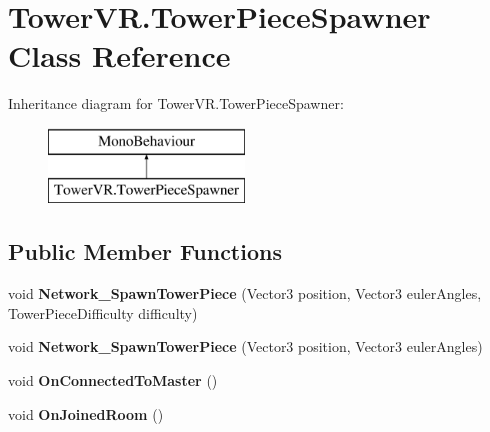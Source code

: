 \hypertarget{class_tower_v_r_1_1_tower_piece_spawner}{}\section{Tower\+V\+R.\+Tower\+Piece\+Spawner Class Reference}
\label{class_tower_v_r_1_1_tower_piece_spawner}
Inheritance diagram for Tower\+V\+R.\+Tower\+Piece\+Spawner\+:\begin{figure}[H]
\begin{center}
\leavevmode
\includegraphics[height=2.000000cm]{class_tower_v_r_1_1_tower_piece_spawner}
\end{center}
\end{figure}
\subsection*{Public Member Functions}
\begin{DoxyCompactItemize}
\item 
void {\bfseries Network\+\_\+\+Spawn\+Tower\+Piece} (Vector3 position, Vector3 euler\+Angles, Tower\+Piece\+Difficulty difficulty)\hypertarget{class_tower_v_r_1_1_tower_piece_spawner_a262d0e9b14f814ec49bc572d906d74f3}{}\label{class_tower_v_r_1_1_tower_piece_spawner_a262d0e9b14f814ec49bc572d906d74f3}

\item 
void {\bfseries Network\+\_\+\+Spawn\+Tower\+Piece} (Vector3 position, Vector3 euler\+Angles)\hypertarget{class_tower_v_r_1_1_tower_piece_spawner_aa167d6fdd1cd667dab34e935d9f82f57}{}\label{class_tower_v_r_1_1_tower_piece_spawner_aa167d6fdd1cd667dab34e935d9f82f57}

\item 
void {\bfseries On\+Connected\+To\+Master} ()\hypertarget{class_tower_v_r_1_1_tower_piece_spawner_a5318d7725ba9f0b6d0f215536c16a7a6}{}\label{class_tower_v_r_1_1_tower_piece_spawner_a5318d7725ba9f0b6d0f215536c16a7a6}

\item 
void {\bfseries On\+Joined\+Room} ()\hypertarget{class_tower_v_r_1_1_tower_piece_spawner_a91f9b22165e13b30aebe5f52c5ab1805}{}\label{class_tower_v_r_1_1_tower_piece_spawner_a91f9b22165e13b30aebe5f52c5ab1805}

\end{DoxyCompactItemize}
